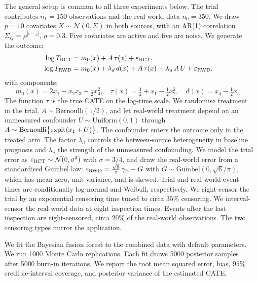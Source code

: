 The general setup is common to all three experiments below.
The trial contributes $n_1 = 150$ observations and the real-world data $n_0 = 350$.
We draw $p = 10$ covariates $X \sim \mathcal{N}(0, \Sigma)$ in both sources, with an AR(1) correlation $\Sigma_{ij} = \rho^{|i-j|}$, $\rho = 0.3$.
Five covariates are active and five are noise.
We generate the outcome:
\begin{equation}
  \begin{aligned}
    \log T_{\mathrm{RCT}} &= m_0(x) + A\, \tau(x) + \varepsilon_{\mathrm{RCT}}, \\
    \log T_{\mathrm{RWD}} &= m_0(x) + \lambda_d\, d(x) + A\, \tau(x)
                     + \lambda_u\, A\, U + \varepsilon_{\mathrm{RWD}},
  \end{aligned}
  \label{eq:sim-dgp}
\end{equation}
with components:
\begin{equation}
  m_0(x) = 2 x_1 - x_2 x_3 + \tfrac{1}{2} x_4^2, \quad \tau(x) = \tfrac{1}{2} + x_1 - \tfrac{1}{2} x_2^2, \quad d(x) = x_4 - \tfrac{1}{2} x_5.
\end{equation}
The function $\tau$ is the true CATE on the log-time scale.
We randomise treatment in the trial, $A \sim \mathrm{Bernoulli}(1/2)$, and let real-world treatment depend on an unmeasured confounder $U \sim \mathrm{Uniform}(0, 1)$ through $A \sim \mathrm{Bernoulli}\bigl\{\operatorname{expit}(x_1 + U)\bigr\}$.
The confounder enters the outcome only in the treated arm.
The factor $\lambda_d$ controls the between-source heterogeneity in baseline prognosis and $\lambda_u$ the strength of the unmeasured confounding.
We model the trial error as $\varepsilon_{\mathrm{RCT}} \sim \mathcal{N}(0, \sigma^2)$ with $\sigma = 3/4$, and draw the real-world error from a standardised Gumbel law: $\varepsilon_{\mathrm{RWD}} = \tfrac{\sqrt{6}}{\pi}\, \gamma_{\mathrm{E}} - G$ with $G \sim \mathrm{Gumbel}(0, \sqrt{6}/\pi)$, which has mean zero, unit variance, and is skewed.
Trial and real-world event times are conditionally log-normal and Weibull, respectively.
We right-censor the trial by an exponential censoring time tuned to circa $35\%$ censoring.
We interval-censor the real-world data at eight inspection times.
Events after the last inspection are right-censored, circa $20\%$ of the real-world observations.
The two censoring types mirror the application.

We fit the Bayesian fusion forest to the combined data with default parameters.
We run 1000 Monte Carlo replications.
Each fit draws 5000 posterior samples after 5000 burn-in iterations.
We report the root mean squared error, bias, $95\%$ credible-interval coverage, and posterior variance of the estimated CATE.

